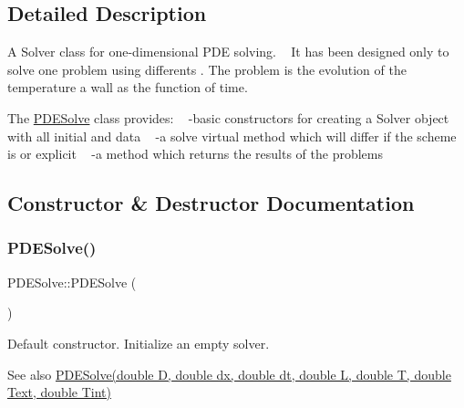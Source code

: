 \subsection{Detailed Description}
A Solver class for one-\/dimensional P\+DE solving. ~\newline
 It has been designed only to solve one problem using differents . The problem is the evolution of the temperature  a wall as the function of time.

The \hyperlink{class_p_d_e_solve}{P\+D\+E\+Solve} class provides\+: ~\newline
-\/basic constructors for creating a Solver object with all initial  and data ~\newline
-\/a solve virtual method which will differ if the scheme is  or explicit ~\newline
-\/a method which returns the results of the problems 

\subsection{Constructor \& Destructor Documentation}
\mbox{\label{class_p_d_e_solve_ae4ffb82f6502c303f1ffdb3831cc4f6d}} 
\subsubsection{\texorpdfstring{P\+D\+E\+Solve()}{PDESolve()}\hspace{0.1cm}{\footnotesize\ttfamily [1/2]}}
{\footnotesize\ttfamily P\+D\+E\+Solve\+::\+P\+D\+E\+Solve (\begin{DoxyParamCaption}{ }\end{DoxyParamCaption})\hspace{0.3cm}{\ttfamily [inline]}}

Default constructor. Initialize an empty solver. \begin{DoxySeeAlso}{See also}
\hyperlink{class_p_d_e_solve_a1cfac8cfbb30ee0bd1c9100a5640f87f}{P\+D\+E\+Solve(double D, double dx, double dt, double L, double T, double Text, double Tint)} 
\end{DoxySeeAlso}
\mbox{\label{class_p_d_e_solve_a1cfac8cfbb30ee0bd1c9100a5640f87f}} 
